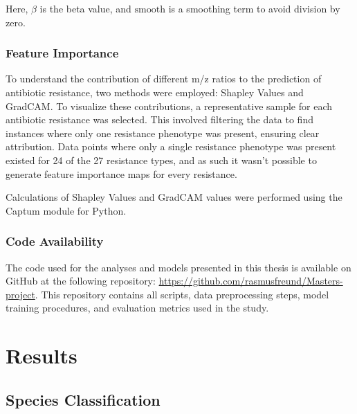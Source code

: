\documentclass[english,11pt,a4paper,titlepage]{article}
\begin{document}
	Here, $\beta$ is the beta value, and $\text{smooth}$ is a smoothing term to avoid division by zero.
	
	\subsubsection*{Feature Importance}
	To understand the contribution of different m/z ratios to the prediction of antibiotic resistance, two methods were employed: Shapley Values and GradCAM. To visualize these contributions, a representative sample for each antibiotic resistance was selected. This involved filtering the data to find instances where only one resistance phenotype was present, ensuring clear attribution. Data points where only a single resistance phenotype was present existed for 24 of the 27 resistance types, and as such it wasn't possible to generate feature importance maps for every resistance.
	
	Calculations of Shapley Values and GradCAM values were performed using the Captum \cite{kokhlikyanCaptumUnifiedGeneric} module for Python.
	
	\subsubsection*{Code Availability}
	The code used for the analyses and models presented in this thesis is available on GitHub at the following repository: \url{https://github.com/rasmusfreund/Masters-project}. This repository contains all scripts, data preprocessing steps, model training procedures, and evaluation metrics used in the study.

\section*{Results}
\subsection*{Species Classification}
\end{document}
